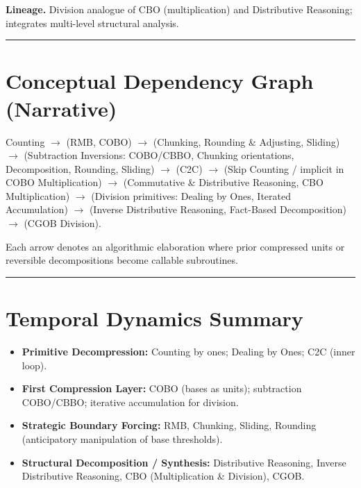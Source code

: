 \documentclass[12pt]{book}
\begin{document}
\textbf{Lineage.} Division analogue of CBO (multiplication) and
Distributive Reasoning; integrates multi-level structural analysis.

\begin{center}\rule{0.5\linewidth}{0.5pt}\end{center}

\section{Conceptual Dependency Graph
(Narrative)}\label{conceptual-dependency-graph-narrative}

Counting \(\to\) (RMB, COBO) \(\to\) (Chunking, Rounding \& Adjusting,
Sliding) \(\to\) (Subtraction Inversions: COBO/CBBO, Chunking
orientations, Decomposition, Rounding, Sliding) \(\to\) (C2C) \(\to\)
(Skip Counting / implicit in COBO Multiplication) \(\to\) (Commutative
\& Distributive Reasoning, CBO Multiplication) \(\to\) (Division
primitives: Dealing by Ones, Iterated Accumulation) \(\to\) (Inverse
Distributive Reasoning, Fact-Based Decomposition) \(\to\) (CGOB
Division).

Each arrow denotes an algorithmic elaboration where prior compressed
units or reversible decompositions become callable subroutines.

\begin{center}\rule{0.5\linewidth}{0.5pt}\end{center}

\section{Temporal Dynamics Summary}\label{temporal-dynamics-summary}

\begin{itemize}
 
\item
  \textbf{Primitive Decompression:} Counting by ones; Dealing by Ones;
  C2C (inner loop).
\item
  \textbf{First Compression Layer:} COBO (bases as units); subtraction
  COBO/CBBO; iterative accumulation for division.
\item
  \textbf{Strategic Boundary Forcing:} RMB, Chunking, Sliding, Rounding
  (anticipatory manipulation of base thresholds).
\item
  \textbf{Structural Decomposition / Synthesis:} Distributive Reasoning,
  Inverse Distributive Reasoning, CBO (Multiplication \& Division),
  CGOB.
\end{itemize}
\end{document}
